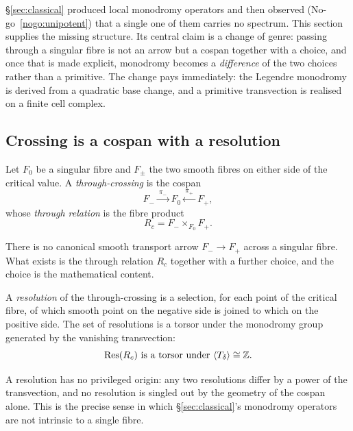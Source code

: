 \label{sec:through-body}

\S\ref{sec:classical} produced local monodromy operators and then observed
(No-go~\ref{nogo:unipotent}) that a single one of them carries no spectrum.  This
section supplies the missing structure.  Its central claim is a change of genre: passing
through a singular fibre is not an arrow but a cospan together with a choice, and once
that is made explicit, monodromy becomes a \emph{difference} of the two choices rather
than a primitive.  The change pays immediately: the Legendre monodromy is derived from
a quadratic base change, and a primitive transvection is realised on a finite cell
complex.

\subsection{Crossing is a cospan with a resolution}

\begin{definition}\label{def:through-crossing}
Let $F_0$ be a singular fibre and $F_{\pm}$ the two smooth fibres on either side of the
critical value.  A \emph{through-crossing} is the cospan
\[
  F_-\xrightarrow{\ \pi_- \ } F_0 \xleftarrow{\ \pi_+ \ } F_+ ,
\]
whose \emph{through relation} is the fibre product
\[
  R_c=F_-\times_{F_0}F_+ .
\]
\end{definition}

\begin{proposal}\label{prop:crossing-not-arrow}
There is no canonical smooth transport arrow $F_-\to F_+$ across a singular fibre.
What exists is the through relation $R_c$ together with a further choice, and the choice
is the mathematical content.
\end{proposal}

\begin{definition}\label{def:resolution-torsor}
A \emph{resolution} of the through-crossing is a selection, for each point of the
critical fibre, of which smooth point on the negative side is joined to which on the
positive side.  The set of resolutions is a torsor under the monodromy group generated
by the vanishing transvection:
\[
  \mathrm{Res}(R_c)\ \text{is a torsor under}\ \langle T_\delta\rangle\cong\Z .
\]
\end{definition}

\begin{remark}
A resolution has no privileged origin: any two resolutions differ by a power of the
transvection, and no resolution is singled out by the geometry of the cospan alone.  This
is the precise sense in which \S\ref{sec:classical}'s monodromy operators are not
intrinsic to a single fibre.
\end{remark}

